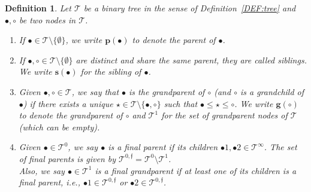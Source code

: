 \documentclass[%
11pt,  reqno]{amsart}
\newcommand{\5}{\textup{V}}
\newtheorem{definition}[theorem]{Definition}
\theoremstyle{remark}
\newcommand{\bul}{\bullet}
\newcommand{\TT}{\mathcal{T}}
\newcommand{\pb}{\mathbf{p}}
\newcommand{\gb}{\mathbf{g}}
\newcommand{\sbf}{\mathbf{s}}
\newcommand{\ff}{\mathfrak{f}}
\numberwithin{equation}{section}
\numberwithin{theorem}{section}
\begin{document}
\begin{definition}\rm
\label{DEF:tree2}
Let $\TT$ be a binary tree in the sense of Definition~\ref{DEF:tree} and 
$\bul, \circ$ be two nodes in $\TT$. 

\begin{enumerate}



\smallskip
\item[(i)]
If $\bul \in \TT\setminus \{ \emptyset\}$, we write $\pb(\bul)$ to denote the parent of $\bul$.

\smallskip
\item[(ii)] 
If $\bul, \circ\in \TT \setminus\{ \emptyset \}$ are distinct and share the same parent, they are called \textit{siblings}. We write $\sbf(\bul)$ for the sibling of $\bul$. 

\smallskip
\item[(iii)] 
Given $\bul, \circ\in \TT$, we say that $\bul$ is the \textit{grandparent} of $\circ$ (and $\circ$ is a \textit{grandchild} of $\bul$) if there exists a unique $\star\in \TT \setminus \{\bul, \circ\}$ such that $\bul \le \star\le \circ$. We write $ \gb(\circ) $ to denote the grandparent of $\circ$ and $\TT^1$ for the set of grandparent nodes of $\TT$ (which can be empty). 

\smallskip
\item[(iv)] 
Given $\bul\in \TT^0$, we say $\bul$ is a \textit{final parent} if its children $\bul1, \bul2 \in \TT^\infty$. The set of final parents is given by $\TT^{0,\ff} = \TT^0 \setminus \TT^1$.
\\
Also, we say $\bul\in \TT^1$ is a \textit{final grandparent} if at least one of its children is a final parent, i.e., $\bul1 \in \TT^{0,\ff}$ or $\bul2 \in \TT^{0,\ff}$.  


\end{enumerate}



\end{definition}
\end{document}

